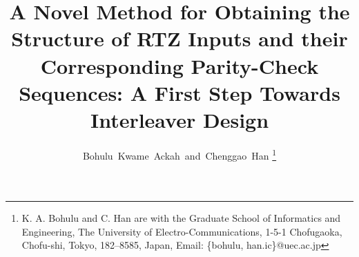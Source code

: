 \documentclass[journal,draftcls,onecolumn,12pt,twoside]{IEEEtran}
\begin{document}
\title{
A Novel Method for Obtaining the Structure of RTZ Inputs and their Corresponding Parity-Check Sequences: A First Step Towards Interleaver Design}
\author{Bohulu~Kwame~Ackah~and~Chenggao~Han
\thanks{K. A. Bohulu and C. Han are with the Graduate School of Informatics and Engineering, The University of Electro-Communications, 1-5-1 Chofugaoka, Chofu-shi, Tokyo, 182--8585, Japan, Email: \{bohulu, han.ic\}@uec.ac.jp}}


\maketitle




%




%






\end{document}
